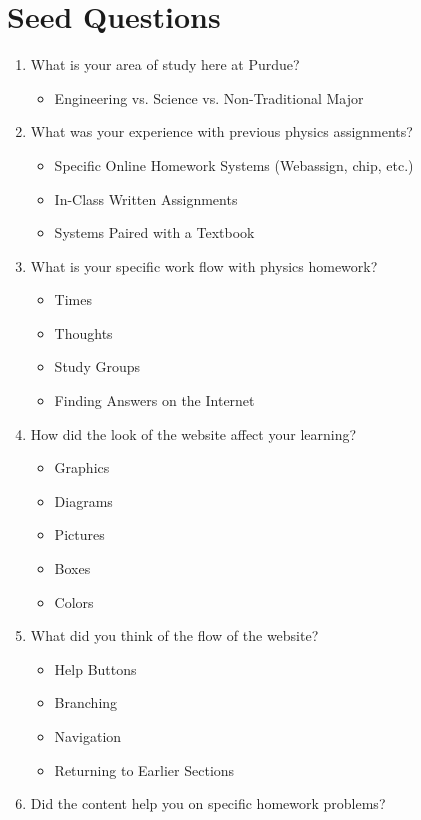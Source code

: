\section{Seed Questions}

\begin{enumerate}
	\item What is your area of study here at Purdue?
	\begin{itemize}
		\item Engineering vs. Science vs. Non-Traditional Major
	\end{itemize}
	\item What was your experience with previous physics assignments?
	\begin{itemize}
		\item Specific Online Homework Systems (Webassign, \gls{chip}, etc.)
		\item In-Class Written Assignments
		\item Systems Paired with a Textbook
	\end{itemize}
	\item What is your specific work flow with physics homework?
	\begin{itemize}
		\item Times
		\item Thoughts
		\item Study Groups
		\item Finding Answers on the Internet
	\end{itemize}
	\item How did the look of the website affect your learning?
	\begin{itemize}
		\item Graphics
		\item Diagrams
		\item Pictures
		\item Boxes
		\item Colors
	\end{itemize}
	\item What did you think of the flow of the website?
	\begin{itemize}
		\item Help Buttons
		\item Branching
		\item Navigation
		\item Returning to Earlier Sections
	\end{itemize}
	\item Did the content help you on specific homework problems?
	\begin{itemize}

\end{itemize}
\end{enumerate}
